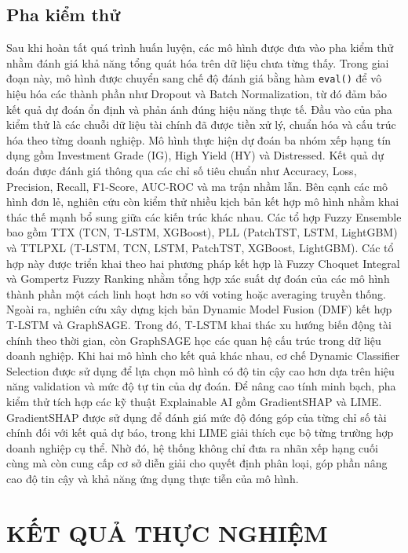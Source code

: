 \documentclass[10pt,twoside]{article}
\begin{document}
\subsection{Pha kiểm thử} Sau khi hoàn tất quá trình huấn luyện, các mô hình được đưa vào pha kiểm thử nhằm đánh giá khả năng tổng quát hóa trên dữ liệu chưa từng thấy. Trong giai đoạn này, mô hình được chuyển sang chế độ đánh giá bằng hàm \texttt{eval()} để vô hiệu hóa các thành phần như Dropout và Batch Normalization, từ đó đảm bảo kết quả dự đoán ổn định và phản ánh đúng hiệu năng thực tế. Đầu vào của pha kiểm thử là các chuỗi dữ liệu tài chính đã được tiền xử lý, chuẩn hóa và cấu trúc hóa theo từng doanh nghiệp. Mô hình thực hiện dự đoán ba nhóm xếp hạng tín dụng gồm Investment Grade (IG), High Yield (HY) và Distressed. Kết quả dự đoán được đánh giá thông qua các chỉ số tiêu chuẩn như Accuracy, Loss, Precision, Recall, F1-Score, AUC-ROC và ma trận nhầm lẫn. Bên cạnh các mô hình đơn lẻ, nghiên cứu còn kiểm thử nhiều kịch bản kết hợp mô hình nhằm khai thác thế mạnh bổ sung giữa các kiến trúc khác nhau. Các tổ hợp Fuzzy Ensemble bao gồm TTX (TCN, T-LSTM, XGBoost), PLL (PatchTST, LSTM, LightGBM) và TTLPXL (T-LSTM, TCN, LSTM, PatchTST, XGBoost, LightGBM). Các tổ hợp này được triển khai theo hai phương pháp kết hợp là Fuzzy Choquet Integral và Gompertz Fuzzy Ranking nhằm tổng hợp xác suất dự đoán của các mô hình thành phần một cách linh hoạt hơn so với voting hoặc averaging truyền thống. Ngoài ra, nghiên cứu xây dựng kịch bản Dynamic Model Fusion (DMF) kết hợp T-LSTM và GraphSAGE. Trong đó, T-LSTM khai thác xu hướng biến động tài chính theo thời gian, còn GraphSAGE học các quan hệ cấu trúc trong dữ liệu doanh nghiệp. Khi hai mô hình cho kết quả khác nhau, cơ chế Dynamic Classifier Selection được sử dụng để lựa chọn mô hình có độ tin cậy cao hơn dựa trên hiệu năng validation và mức độ tự tin của dự đoán. Để nâng cao tính minh bạch, pha kiểm thử tích hợp các kỹ thuật Explainable AI gồm GradientSHAP và LIME. GradientSHAP được sử dụng để đánh giá mức độ đóng góp của từng chỉ số tài chính đối với kết quả dự báo, trong khi LIME giải thích cục bộ từng trường hợp doanh nghiệp cụ thể. Nhờ đó, hệ thống không chỉ đưa ra nhãn xếp hạng cuối cùng mà còn cung cấp cơ sở diễn giải cho quyết định phân loại, góp phần nâng cao độ tin cậy và khả năng ứng dụng thực tiễn của mô hình.


\section{KẾT QUẢ THỰC NGHIỆM}
\end{document}
